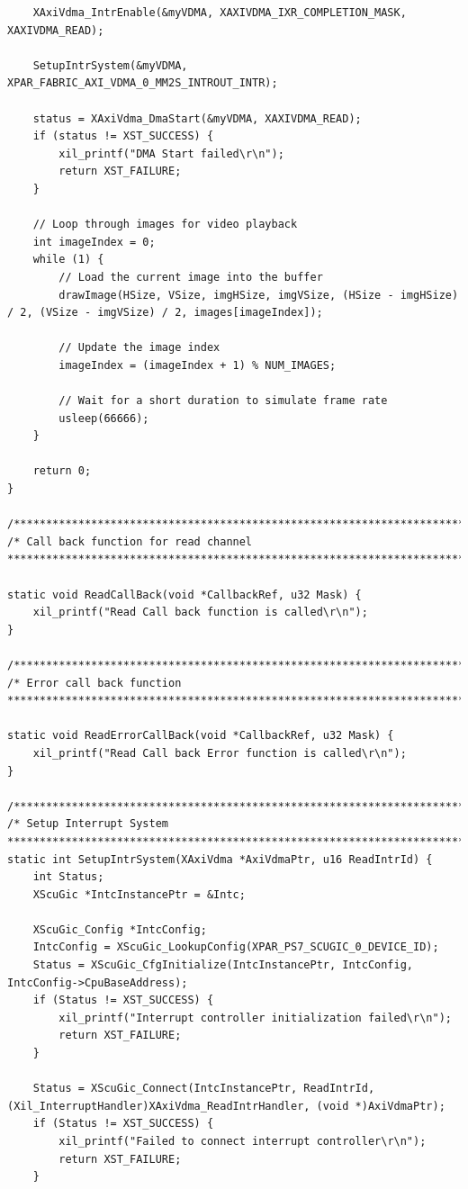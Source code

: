 \documentclass{article}
\newenvironment{longlisting}{\captionsetup{type=listing}}{}
\begin{document}
\begin{longlisting}
\begin{verbatim}
    XAxiVdma_IntrEnable(&myVDMA, XAXIVDMA_IXR_COMPLETION_MASK, XAXIVDMA_READ);

    SetupIntrSystem(&myVDMA, XPAR_FABRIC_AXI_VDMA_0_MM2S_INTROUT_INTR);

    status = XAxiVdma_DmaStart(&myVDMA, XAXIVDMA_READ);
    if (status != XST_SUCCESS) {
        xil_printf("DMA Start failed\r\n");
        return XST_FAILURE;
    }

    // Loop through images for video playback
    int imageIndex = 0;
    while (1) {
        // Load the current image into the buffer
        drawImage(HSize, VSize, imgHSize, imgVSize, (HSize - imgHSize) / 2, (VSize - imgVSize) / 2, images[imageIndex]);

        // Update the image index
        imageIndex = (imageIndex + 1) % NUM_IMAGES;

        // Wait for a short duration to simulate frame rate
        usleep(66666);
    }

    return 0;
}

/*****************************************************************************/
/* Call back function for read channel
******************************************************************************/

static void ReadCallBack(void *CallbackRef, u32 Mask) {
    xil_printf("Read Call back function is called\r\n");
}

/*****************************************************************************/
/* Error call back function
******************************************************************************/

static void ReadErrorCallBack(void *CallbackRef, u32 Mask) {
    xil_printf("Read Call back Error function is called\r\n");
}

/*****************************************************************************/
/* Setup Interrupt System
******************************************************************************/
static int SetupIntrSystem(XAxiVdma *AxiVdmaPtr, u16 ReadIntrId) {
    int Status;
    XScuGic *IntcInstancePtr = &Intc;

    XScuGic_Config *IntcConfig;
    IntcConfig = XScuGic_LookupConfig(XPAR_PS7_SCUGIC_0_DEVICE_ID);
    Status = XScuGic_CfgInitialize(IntcInstancePtr, IntcConfig, IntcConfig->CpuBaseAddress);
    if (Status != XST_SUCCESS) {
        xil_printf("Interrupt controller initialization failed\r\n");
        return XST_FAILURE;
    }

    Status = XScuGic_Connect(IntcInstancePtr, ReadIntrId, (Xil_InterruptHandler)XAxiVdma_ReadIntrHandler, (void *)AxiVdmaPtr);
    if (Status != XST_SUCCESS) {
        xil_printf("Failed to connect interrupt controller\r\n");
        return XST_FAILURE;
    }


\end{verbatim}
\end{longlisting}
\end{document}
